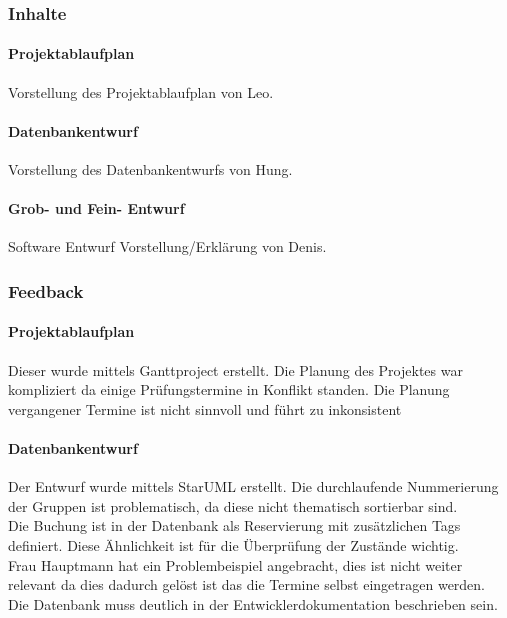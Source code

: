 \subsubsection{Inhalte} 

\paragraph{Projektablaufplan}
Vorstellung des Projektablaufplan von Leo.


\paragraph{Datenbankentwurf}
Vorstellung des Datenbankentwurfs von Hung. 


\paragraph{Grob- und Fein- Entwurf}
Software Entwurf Vorstellung/Erklärung von Denis.


\subsubsection{Feedback}

\paragraph{Projektablaufplan}
Dieser wurde mittels Ganttproject erstellt. 
Die Planung des Projektes war kompliziert da einige Prüfungstermine in Konflikt standen.
Die Planung vergangener Termine ist nicht sinnvoll und führt zu inkonsistent 

\paragraph{Datenbankentwurf}
Der Entwurf wurde mittels StarUML erstellt.
Die durchlaufende Nummerierung der Gruppen ist problematisch, da diese nicht thematisch sortierbar sind.
\\Die Buchung ist in der Datenbank als Reservierung mit zusätzlichen Tags definiert. Diese Ähnlichkeit ist für die Überprüfung der Zustände wichtig.
\\Frau Hauptmann hat ein Problembeispiel angebracht, dies ist nicht weiter relevant da dies dadurch gelöst ist das die Termine selbst eingetragen werden.
\\Die Datenbank muss deutlich in der Entwicklerdokumentation beschrieben sein.

